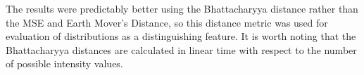 The results were predictably better using the Bhattacharyya distance rather than the MSE and Earth Mover's Distance, so this distance metric was used for evaluation of distributions as a distinguishing feature.
It is worth noting that the Bhattacharyya distances are calculated in linear time with respect to the number of possible intensity values.









